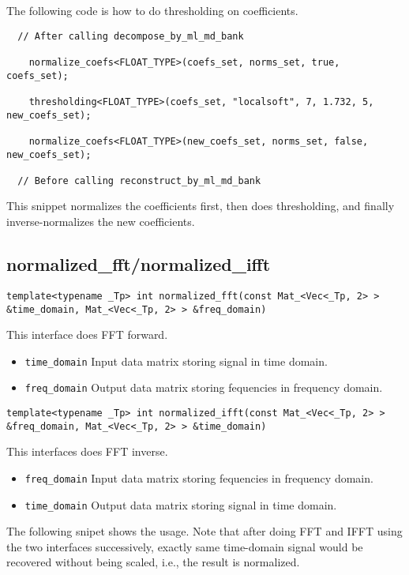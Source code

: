 \documentclass[a4paper,5pt]{article}
\begin{document}
The following code is how to do thresholding on coefficients.

\begin{lstlisting}
  // After calling decompose_by_ml_md_bank

	normalize_coefs<FLOAT_TYPE>(coefs_set, norms_set, true, coefs_set);
	
	thresholding<FLOAT_TYPE>(coefs_set, "localsoft", 7, 1.732, 5, new_coefs_set);

	normalize_coefs<FLOAT_TYPE>(new_coefs_set, norms_set, false, new_coefs_set);
	
  // Before calling reconstruct_by_ml_md_bank
\end{lstlisting} 

  This snippet normalizes the coefficients first, then does thresholding, and finally inverse-normalizes the new coefficients.
  
\subsection{normalized\_fft/normalized\_ifft}

\lstinline{template<typename _Tp> int normalized_fft(const Mat_<Vec<_Tp, 2> > &time_domain, Mat_<Vec<_Tp, 2> > &freq_domain) }

This interface does FFT forward.

\begin{itemize}
\item \lstinline{time_domain} Input data matrix storing signal in time domain.
\item \lstinline{freq_domain} Output data matrix storing fequencies in frequency domain.
\end{itemize}

\noindent
\lstinline{template<typename _Tp> int normalized_ifft(const Mat_<Vec<_Tp, 2> > &freq_domain, Mat_<Vec<_Tp, 2> > &time_domain) }

This interfaces does FFT inverse.

\begin{itemize}
\item \lstinline{freq_domain} Input data matrix storing fequencies in frequency domain.
\item \lstinline{time_domain} Output data matrix storing signal in time domain.
\end{itemize}

The following snipet shows the usage. Note that after doing FFT and IFFT using the two interfaces successively, exactly same time-domain signal would be recovered without being scaled, i.e., the result is normalized.
\end{document}
